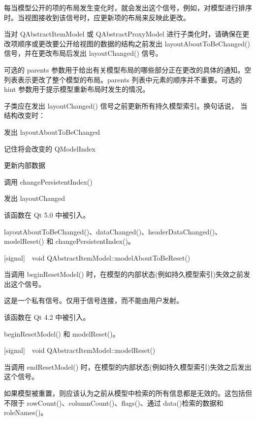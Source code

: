 每当模型公开的项的布局发生变化时，就会发出这个信号，例如，对模型进行排序时。当视图接收到该信号时，应更新项的布局来反映此更改。

当对 QAbstractItemModel 或 QAbstractProxyModel 进行子类化时，请确保在更改项顺序或更改要公开给视图的数据的结构之前发出 layoutAboutToBeChanged() 信号，并在更改布局后发出 layoutChanged() 信号。

可选的 parents 参数用于给出有关模型布局的哪些部分正在更改的具体的通知。空列表表示更改了整个模型的布局。parents 列表中元素的顺序并不重要。可选的 hint 参数用于提示模型重新布局时发生的情况。

子类应在发​​出 layoutChanged() 信号之前更新所有持久模型索引。换句话说，
当结构改变时：

\begin{compactitem}[\arr]
\item 发出 layoutAboutToBeChanged
\item 记住将会改变的 QModelIndex
\item 更新内部数据
\item 调用 changePersistentIndex()
\item 发出 layoutChanged
\end{compactitem}

该函数在 Qt 5.0 中被引入。

\begin{seeAlso}
layoutAboutToBeChanged()、dataChanged()、headerDataChanged()、modelReset() 和 changePersistentIndex()。
\end{seeAlso}

[signal] void QAbstractItemModel::modelAboutToBeReset()

当调用 beginResetModel() 时，在模型的内部状态(例如持久模型索引)失效之前发出这个信号。

\begin{notice}
这是一个私有信号。仅用于信号连接，而不能由用户发射。
\end{notice}

该函数在 Qt 4.2 中被引入。

\begin{seeAlso}
beginResetModel() 和 modelReset()。
\end{seeAlso}

[signal] void QAbstractItemModel::modelReset()

当调用 endResetModel() 时，在模型的内部状态(例如持久模型索引)失效之后发出这个信号。

\begin{notice}
如果模型被重置，则应该认为之前从模型中检索的所有信息都是无效的。这包括但不限于 rowCount()、columnCount()、flags()、通过 data()检索的数据和 roleNames()。
\end{notice}

